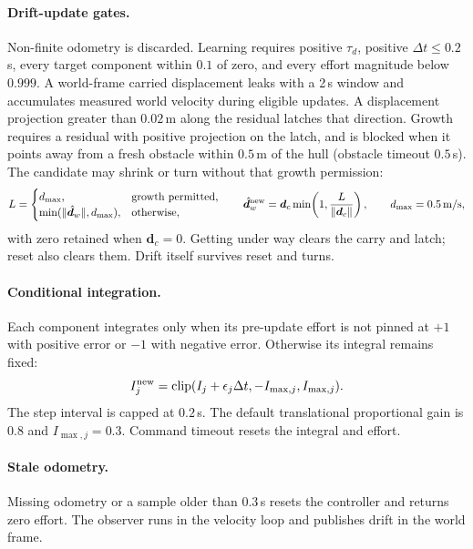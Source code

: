 \paragraph{Drift-update gates.} Non-finite odometry is discarded. Learning
requires positive $\tau_d$, positive $\Delta t\le0.2$\,s, every target component
within $0.1$ of zero, and every effort magnitude below $0.999$. A world-frame
carried displacement leaks with a 2\,s window and accumulates measured world
velocity during eligible updates. A displacement projection greater than
$0.02$\,m along the residual latches that direction. Growth requires a residual
with positive projection on the latch, and is blocked when it points away from
a fresh obstacle within $0.5$\,m of the hull (obstacle timeout $0.5$\,s).
The candidate may shrink or turn without that growth permission:
\[
  L=\begin{cases}d_{\max},&\text{growth permitted},\\
       \min(\|\hat{\bm d}_w\|,d_{\max}),&\text{otherwise},\end{cases}
  \qquad \hat{\bm d}_w^{\rm new}
   =\bm d_c\min\!\left(1,\frac{L}{\|\bm d_c\|}\right),\qquad d_{\max}=0.5\,\text{m/s},
\]
with zero retained when $\bm d_c=0$. Getting under way clears the carry and
latch; reset also clears them. Drift itself survives reset and turns.

\paragraph{Conditional integration.} Each component integrates only when its
pre-update effort is not pinned at $+1$ with positive error or $-1$ with
negative error. Otherwise its integral remains fixed:
\[
  I_j^{\rm new}=\operatorname{clip}(I_j+\epsilon_j\Delta t,-I_{\max,j},I_{\max,j}).
\]
The step interval is capped at $0.2$\,s. The default translational proportional gain is $0.8$ and
$I_{\max,j}=0.3$.
Command timeout resets the integral and effort.

\paragraph{Stale odometry.} Missing odometry or a sample older than $0.3$\,s
resets the controller and returns zero effort. The observer runs in the velocity
loop and publishes drift in the world frame.

